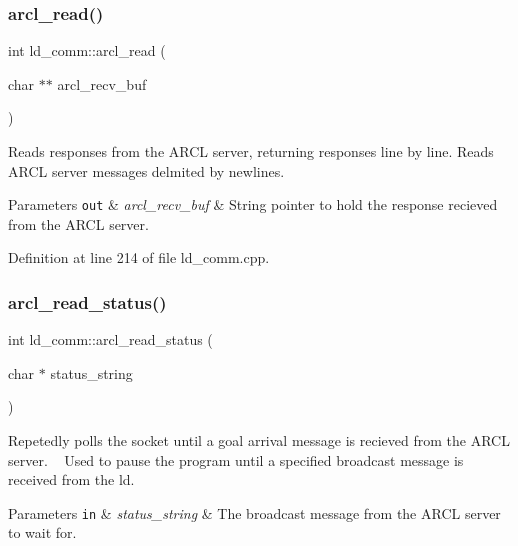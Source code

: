 \mbox{\label{classld__comm_afaca1d34911ee06e0b8d07efd3a074d3}} 
\subsubsection{\texorpdfstring{arcl\+\_\+read()}{arcl\_read()}}
{\footnotesize\ttfamily int ld\+\_\+comm\+::arcl\+\_\+read (\begin{DoxyParamCaption}\item[{char $\ast$$\ast$}]{arcl\+\_\+recv\+\_\+buf }\end{DoxyParamCaption})}

Reads responses from the A\+R\+CL server, returning responses line by line. Reads A\+R\+CL server messages delmited by newlines. 
\begin{DoxyParams}[1]{Parameters}
\mbox{\tt out}  & {\em arcl\+\_\+recv\+\_\+buf} & String pointer to hold the response recieved from the A\+R\+CL server. \\
\hline
\end{DoxyParams}


Definition at line 214 of file ld\+\_\+comm.\+cpp.

\mbox{\label{classld__comm_a936a049861974c0ffa5d836a1364aa03}} 
\subsubsection{\texorpdfstring{arcl\+\_\+read\+\_\+status()}{arcl\_read\_status()}}
{\footnotesize\ttfamily int ld\+\_\+comm\+::arcl\+\_\+read\+\_\+status (\begin{DoxyParamCaption}\item[{char $\ast$}]{status\+\_\+string }\end{DoxyParamCaption})}

Repetedly polls the socket until a goal arrival message is recieved from the A\+R\+CL server. ~\newline
Used to pause the program until a specified broadcast message is received from the ld. 
\begin{DoxyParams}[1]{Parameters}
\mbox{\tt in}  & {\em status\+\_\+string} & The broadcast message from the A\+R\+CL server to wait for. \\
\hline
\end{DoxyParams}


